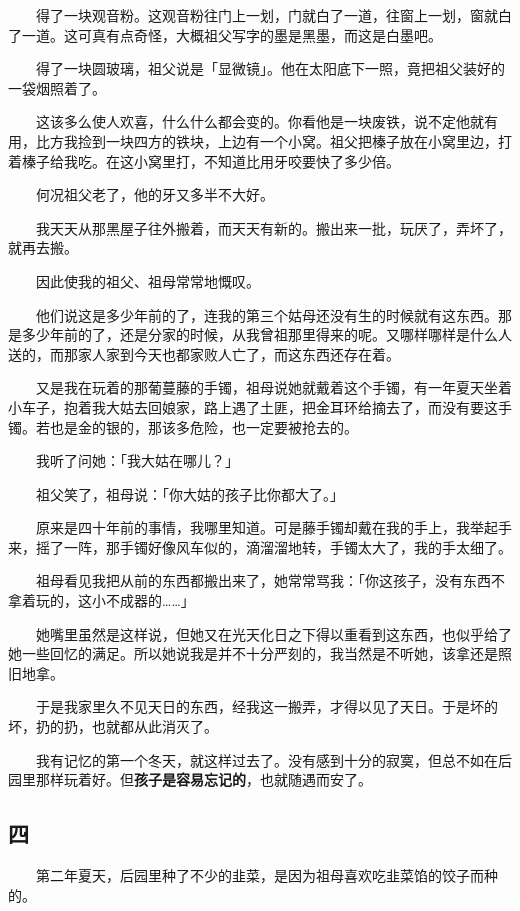 \documentclass[UTF8]{ctexart}
\begin{document}
　　得了一块观音粉。这观音粉往门上一划，门就白了一道，往窗上一划，窗就白了一道。这可真有点奇怪，大概祖父写字的墨是黑墨，而这是白墨吧。

　　得了一块圆玻璃，祖父说是「显微镜」。他在太阳底下一照，竟把祖父装好的一袋烟照着了。

　　这该多么使人欢喜，什么什么都会变的。你看他是一块废铁，说不定他就有用，比方我捡到一块四方的铁块，上边有一个小窝。祖父把榛子放在小窝里边，打着榛子给我吃。在这小窝里打，不知道比用牙咬要快了多少倍。

　　何况祖父老了，他的牙又多半不大好。

　　我天天从那黑屋子往外搬着，而天天有新的。搬出来一批，玩厌了，弄坏了，就再去搬。

　　因此使我的祖父、祖母常常地慨叹。

　　他们说这是多少年前的了，连我的第三个姑母还没有生的时候就有这东西。那是多少年前的了，还是分家的时候，从我曾祖那里得来的呢。又哪样哪样是什么人送的，而那家人家到今天也都家败人亡了，而这东西还存在着。

　　又是我在玩着的那葡蔓藤的手镯，祖母说她就戴着这个手镯，有一年夏天坐着小车子，抱着我大姑去回娘家，路上遇了土匪，把金耳环给摘去了，而没有要这手镯。若也是金的银的，那该多危险，也一定要被抢去的。

　　我听了问她：「我大姑在哪儿？」

　　祖父笑了，祖母说：「你大姑的孩子比你都大了。」

　　原来是四十年前的事情，我哪里知道。可是藤手镯却戴在我的手上，我举起手来，摇了一阵，那手镯好像风车似的，滴溜溜地转，手镯太大了，我的手太细了。

　　祖母看见我把从前的东西都搬出来了，她常常骂我：「你这孩子，没有东西不拿着玩的，这小不成器的……」

　　她嘴里虽然是这样说，但她又在光天化日之下得以重看到这东西，也似乎给了她一些回忆的满足。所以她说我是并不十分严刻的，我当然是不听她，该拿还是照旧地拿。

　　于是我家里久不见天日的东西，经我这一搬弄，才得以见了天日。于是坏的坏，扔的扔，也就都从此消灭了。

　　我有记忆的第一个冬天，就这样过去了。没有感到十分的寂寞，但总不如在后园里那样玩着好。但\textbf{孩子是容易忘记的}，也就随遇而安了。

\subsection{四}

　　第二年夏天，后园里种了不少的韭菜，是因为祖母喜欢吃韭菜馅的饺子而种的。
\end{document}
